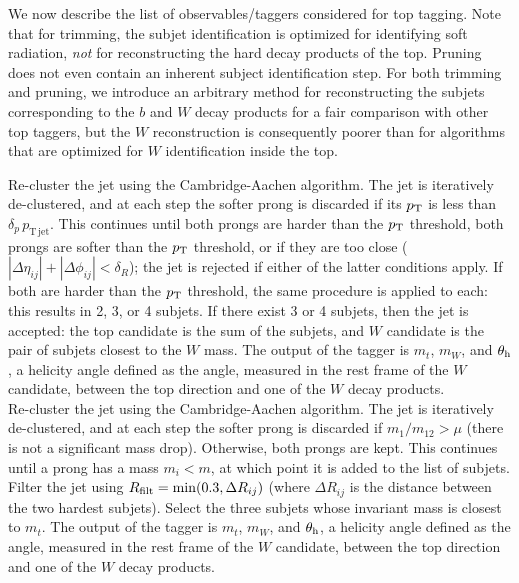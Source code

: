 We now describe the list of observables/taggers considered for top tagging. Note that for trimming, the subjet identification is optimized for identifying soft radiation, \emph{not} for reconstructing the hard decay products of the top. Pruning does not even contain an inherent subject identification step. For both trimming and pruning, we introduce an arbitrary method for reconstructing the subjets corresponding to the $b$ and $W$ decay products for a fair comparison with other top taggers, but the $W$ reconstruction is consequently poorer than for algorithms that are optimized for $W$ identification inside the top.

 Re-cluster the jet using the Cambridge-Aachen algorithm. The jet is iteratively de-clustered, and at each step the softer prong is discarded if its $p_{\rm T}$ is less than $\delta_p\,p_{\mathrm{T\,jet}}$. This continues until both prongs are harder than the $p_{\rm T}$ threshold, both prongs are softer than the $p_{\rm T}$ threshold, or if they are too close ($|\Delta\eta_{ij}|+|\Delta\phi_{ij}|<\delta_R$); the jet is rejected if either of the latter conditions apply. If both are harder than the $p_{\rm T}$ threshold, the same procedure is applied to each: this results in 2, 3, or 4 subjets. If there exist 3 or 4 subjets, then the jet is accepted: the top candidate is the sum of the subjets, and $W$ candidate is the pair of subjets closest to the $W$ mass. The output of the tagger is $m_t$, $m_W$, and $\theta_{\rm h}$, a helicity angle defined as the angle, measured in the rest frame of the $W$ candidate, between the top direction and one of the $W$ decay products.\\

 Re-cluster the jet using the Cambridge-Aachen algorithm. The jet is iteratively de-clustered, and at each step the softer prong is discarded if $m_1/m_{12}>\mu$ (there is not a significant mass drop). Otherwise, both prongs are kept. This continues until a prong has a mass $m_i < m$, at which point it is added to the list of subjets. Filter the jet using $R_{\rm filt}=\mathrm{min}(0.3,\Delta R_{ij})$ (where $\Delta R_{ij}$ is the distance between the two hardest subjets). Select the three subjets whose invariant mass is closest to $m_t$. The output of the tagger is $m_t$, $m_W$, and $\theta_{\rm h}$, a helicity angle defined as the angle, measured in the rest frame of the $W$ candidate, between the top direction and one of the $W$ decay products.\\

